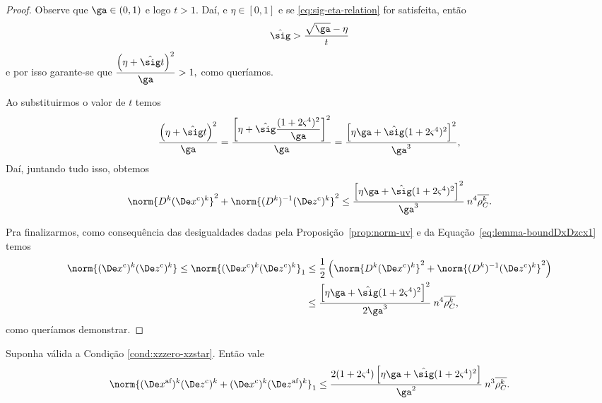 \begin{proof}
Observe que $\ga\in(0,1)$ e logo $t > 1$.  Daí, e $\eta\in[0,1]$ e   se \eqref{eq:sig-eta-relation} for satisfeita, então 
\[
\nextsig > \dfrac{\sqrt{\ga} - \eta}{t}
\]
e por isso garante-se que 
$
	\dfrac{\left(\eta +{\nextsig} t \right)^{2}}{\ga} >1,
$
como queríamos.

Ao substituirmos o valor de $t$ temos 
\[
	\dfrac{\left(\eta +{\nextsig} t \right)^{2}}{\ga} = \dfrac{\left[\eta + \nextsig\dfrac{(1+2\bdxzstar^{4})^{2}}{\ga}\right]^{2}}{\ga} = \dfrac{\left[\eta\ga + \nextsig(1+2\bdxzstar^{4})^{2}\right]^{2}}{\ga^{3}},
\] 
Daí, juntando tudo isso, obtemos
	\begin{equation}\label{eq:lemma-boundDxDzcx1}
		\norm{\Dk\Dekcox}^{2} + \norm{\Dik\Dekcoz}^{2} \leq \dfrac{\left[\eta\ga + \nextsig(1+2\bdxzstar^{4})^{2}\right]^{2}}{\ga^{3}} \: n^{4}\rhoCkb.
	\end{equation}

Pra finalizarmos, como consequência  das desigualdades dadas pela Proposição~\ref{prop:norm-uv} e da Equação~\eqref{eq:lemma-boundDxDzcx1} temos
\[
\begin{aligned}  				 
	\norm{ \Dekcox  \Dekcoz  } \leq \norm{ \Dekcox  \Dekcoz  }_{1}   & \leq \frac{1}{2}\left(\norm{\Dk \Dekcox}^{2} + \norm{\Dik  \Dekcoz  }^{2}\right) \notag
  					\\ 
  					& \leq \dfrac{\left[\eta\ga + \nextsig(1+2\bdxzstar^{4})^{2}\right]^{2}}{2\ga^{3}} \: n^{4}\rhoCkb,
\end{aligned}
\]
como queríamos demonstrar.
\end{proof}

\begin{lema}\label{lemma:boundDxDzaff-c}
	Suponha válida a Condição  \ref{cond:xzzero-xzstar}. Então vale 
	\begin{equation}\label{eq:lemma-boundDxDzaff-c}
		\norm{ \dekx\Dekcoz + \Dekcox  \dekz  }_{1} \leq \dfrac{2(1+2\bdxzstar^{4})\left[\eta\ga + \nextsig(1+2\bdxzstar^{4})^{2}\right]}{\ga^{2}}\: n^{3}\rhoCkb.
	\end{equation}

\end{lema}

